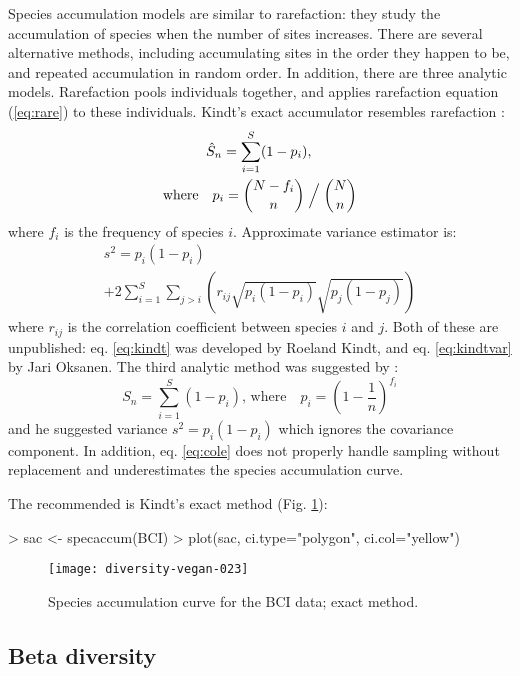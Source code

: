 \documentclass[a4paper,10pt,twocolumn]{article}
\begin{document}
Species accumulation models are similar to rarefaction: they study the
accumulation of species when the number of sites increases.  There are
several alternative methods, including accumulating sites in the order
they happen to be, and repeated accumulation in random order.  In
addition, there are three analytic models.  Rarefaction pools
individuals together, and applies rarefaction equation (\ref{eq:rare})
to these individuals.  Kindt's exact accumulator resembles rarefaction
\citep{UglandEtal03}:
\begin{multline}
\label{eq:kindt}
\hat S_n = \sum_{i=1}^S (1 - p_i), \, \\ \text{where} \quad  p_i = {N- f_i
\choose n} \Bigm / {N \choose n}
\end{multline}
where $f_i$ is the frequency of species $i$.  Approximate variance
estimator is:
\begin{multline}
\label{eq:kindtvar}
s^2 = p_i (1 - p_i)  \\ + 2 \sum_{i=1}^S \sum_{j>i} \left( r_{ij}
  \sqrt{p_i(1-p_i)} \sqrt{p_j (1-p_j)}\right)
\end{multline}
where $r_{ij}$ is the correlation coefficient between species $i$ and
$j$.  Both of these are unpublished: eq. \ref{eq:kindt} was developed
by Roeland Kindt, and eq. \ref{eq:kindtvar} by Jari Oksanen. The third
analytic method was suggested by \citet{Coleman82}:
\begin{equation}
\label{eq:cole}
S_n = \sum_{i=1}^S (1 - p_i), \, \text{where} \quad p_i = \left(1 - \frac{1}{n}\right)^{f_i}
\end{equation}
and he suggested variance $s^2 = p_i (1-p_i)$ which ignores the
covariance component.  In addition, eq. \ref{eq:cole} does not
properly handle sampling without replacement and underestimates the
species accumulation curve.

The recommended is Kindt's exact method (Fig. \ref{fig:sac}):
\begin{Schunk}
\begin{Sinput}
> sac <- specaccum(BCI)
> plot(sac, ci.type="polygon", ci.col="yellow")
\end{Sinput}
\end{Schunk}
\begin{figure}
\texttt{[image: diversity-vegan-023]}
\caption{Species accumulation curve for the BCI data; exact method.}
\label{fig:sac}
\end{figure}

\subsection{Beta diversity}
\end{document}
